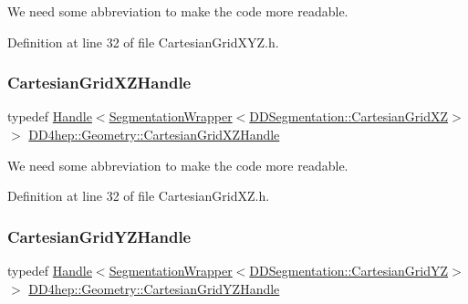 We need some abbreviation to make the code more readable. 



Definition at line 32 of file Cartesian\+Grid\+X\+Y\+Z.\+h.

\hypertarget{namespace_d_d4hep_1_1_geometry_a3ae1751ca0d9c7d138f97af6c2caedbc}{}\label{namespace_d_d4hep_1_1_geometry_a3ae1751ca0d9c7d138f97af6c2caedbc} 
\subsubsection{\texorpdfstring{Cartesian\+Grid\+X\+Z\+Handle}{CartesianGridXZHandle}}
{\footnotesize\ttfamily typedef \hyperlink{class_d_d4hep_1_1_handle}{Handle}$<$\hyperlink{class_d_d4hep_1_1_geometry_1_1_segmentation_wrapper}{Segmentation\+Wrapper}$<$\hyperlink{class_d_d4hep_1_1_d_d_segmentation_1_1_cartesian_grid_x_z}{D\+D\+Segmentation\+::\+Cartesian\+Grid\+XZ}$>$ $>$ \hyperlink{namespace_d_d4hep_1_1_geometry_a3ae1751ca0d9c7d138f97af6c2caedbc}{D\+D4hep\+::\+Geometry\+::\+Cartesian\+Grid\+X\+Z\+Handle}}



We need some abbreviation to make the code more readable. 



Definition at line 32 of file Cartesian\+Grid\+X\+Z.\+h.

\hypertarget{namespace_d_d4hep_1_1_geometry_afd3542602caa1ff9674c251a7747b0f6}{}\label{namespace_d_d4hep_1_1_geometry_afd3542602caa1ff9674c251a7747b0f6} 
\subsubsection{\texorpdfstring{Cartesian\+Grid\+Y\+Z\+Handle}{CartesianGridYZHandle}}
{\footnotesize\ttfamily typedef \hyperlink{class_d_d4hep_1_1_handle}{Handle}$<$\hyperlink{class_d_d4hep_1_1_geometry_1_1_segmentation_wrapper}{Segmentation\+Wrapper}$<$\hyperlink{class_d_d4hep_1_1_d_d_segmentation_1_1_cartesian_grid_y_z}{D\+D\+Segmentation\+::\+Cartesian\+Grid\+YZ}$>$ $>$ \hyperlink{namespace_d_d4hep_1_1_geometry_afd3542602caa1ff9674c251a7747b0f6}{D\+D4hep\+::\+Geometry\+::\+Cartesian\+Grid\+Y\+Z\+Handle}}



